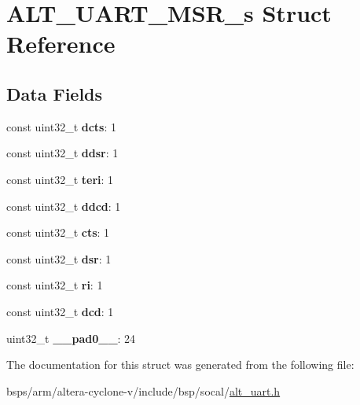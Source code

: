 \hypertarget{structALT__UART__MSR__s}{}\section{A\+L\+T\+\_\+\+U\+A\+R\+T\+\_\+\+M\+S\+R\+\_\+s Struct Reference}
\label{structALT__UART__MSR__s}
\subsection*{Data Fields}
\begin{DoxyCompactItemize}
\item 
\mbox{\label{structALT__UART__MSR__s_afe6cd3069adc141e1eae310f72299250}} 
const uint32\+\_\+t {\bfseries dcts}\+: 1
\item 
\mbox{\label{structALT__UART__MSR__s_a0db0fea6a5b4c26068c809a13e18b5a5}} 
const uint32\+\_\+t {\bfseries ddsr}\+: 1
\item 
\mbox{\label{structALT__UART__MSR__s_a4326b0e990cad19b6c41b4bc2a44ee9d}} 
const uint32\+\_\+t {\bfseries teri}\+: 1
\item 
\mbox{\label{structALT__UART__MSR__s_a15702275f50bae10015c26ceb4739a82}} 
const uint32\+\_\+t {\bfseries ddcd}\+: 1
\item 
\mbox{\label{structALT__UART__MSR__s_a90bd07276c90a2ac439653efb0fa81ce}} 
const uint32\+\_\+t {\bfseries cts}\+: 1
\item 
\mbox{\label{structALT__UART__MSR__s_ae1deb420d1b808a846c0fba898b668b8}} 
const uint32\+\_\+t {\bfseries dsr}\+: 1
\item 
\mbox{\label{structALT__UART__MSR__s_abc83f317e472165639d0b3e855ea0def}} 
const uint32\+\_\+t {\bfseries ri}\+: 1
\item 
\mbox{\label{structALT__UART__MSR__s_a3a923cd48ef1cddc5f527754afe3ba02}} 
const uint32\+\_\+t {\bfseries dcd}\+: 1
\item 
\mbox{\label{structALT__UART__MSR__s_a7bfd0b23c230f6f63910ca50c275e922}} 
uint32\+\_\+t {\bfseries \+\_\+\+\_\+pad0\+\_\+\+\_\+}\+: 24
\end{DoxyCompactItemize}


The documentation for this struct was generated from the following file\+:\begin{DoxyCompactItemize}
\item 
bsps/arm/altera-\/cyclone-\/v/include/bsp/socal/\mbox{\hyperlink{alt__uart_8h}{alt\+\_\+uart.\+h}}\end{DoxyCompactItemize}
